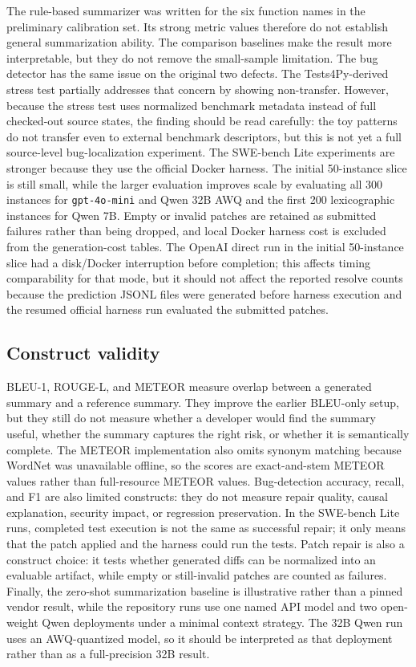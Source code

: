 \documentclass[preprint,12pt]{elsarticle}
\begin{document}
The rule-based summarizer was written for the six function names in the preliminary calibration set. Its strong metric values therefore do not establish general summarization ability. The comparison baselines make the result more interpretable, but they do not remove the small-sample limitation. The bug detector has the same issue on the original two defects. The Tests4Py-derived stress test partially addresses that concern by showing non-transfer. However, because the stress test uses normalized benchmark metadata instead of full checked-out source states, the finding should be read carefully: the toy patterns do not transfer even to external benchmark descriptors, but this is not yet a full source-level bug-localization experiment. The SWE-bench Lite experiments are stronger because they use the official Docker harness. The initial 50-instance slice is still small, while the larger evaluation improves scale by evaluating all 300 instances for \texttt{gpt-4o-mini} and Qwen 32B AWQ and the first 200 lexicographic instances for Qwen 7B. Empty or invalid patches are retained as submitted failures rather than being dropped, and local Docker harness cost is excluded from the generation-cost tables. The OpenAI direct run in the initial 50-instance slice had a disk/Docker interruption before completion; this affects timing comparability for that mode, but it should not affect the reported resolve counts because the prediction JSONL files were generated before harness execution and the resumed official harness run evaluated the submitted patches.

\subsection{Construct validity}

BLEU-1, ROUGE-L, and METEOR measure overlap between a generated summary and a reference summary. They improve the earlier BLEU-only setup, but they still do not measure whether a developer would find the summary useful, whether the summary captures the right risk, or whether it is semantically complete. The METEOR implementation also omits synonym matching because WordNet was unavailable offline, so the scores are exact-and-stem METEOR values rather than full-resource METEOR values. Bug-detection accuracy, recall, and F1 are also limited constructs: they do not measure repair quality, causal explanation, security impact, or regression preservation. In the SWE-bench Lite runs, completed test execution is not the same as successful repair; it only means that the patch applied and the harness could run the tests. Patch repair is also a construct choice: it tests whether generated diffs can be normalized into an evaluable artifact, while empty or still-invalid patches are counted as failures. Finally, the zero-shot summarization baseline is illustrative rather than a pinned vendor result, while the repository runs use one named API model and two open-weight Qwen deployments under a minimal context strategy. The 32B Qwen run uses an AWQ-quantized model, so it should be interpreted as that deployment rather than as a full-precision 32B result.
\end{document}

